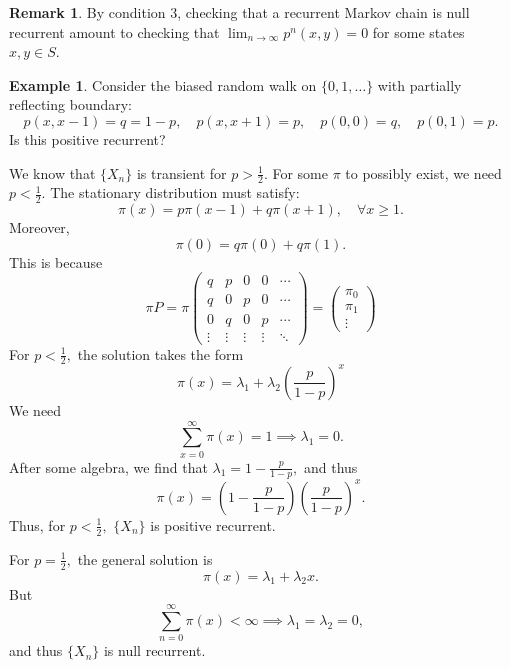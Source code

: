 \documentclass[10pt, oneside]{article}
\theoremstyle{definition}
\newtheorem{exmp}{Example}[section]
\newtheorem{rem}{Remark}
\begin{document}
\begin{rem}
    By condition 3, checking that a recurrent Markov chain is null recurrent amount to checking that $\lim_{n\to \infty}p^n(x,y) = 0$ for some states $x,y \in S.$
\end{rem}
\begin{exmp}
    Consider the biased random walk on $\{0,1, \dots\}$ with partially reflecting boundary: 
    \[p(x,x-1) = q= 1-p, \quad p(x,x+1) = p, \quad p(0,0) = q, \quad p(0,1) =p.\]
    Is this positive recurrent?

    We know that $\{X_n\}$ is transient for $p > \frac{1}{2}.$ For some $\pi$ to possibly exist, we need $p < \frac{1}{2}.$ The stationary distribution must satisfy:
    \[\pi(x) = p\pi(x-1) + q\pi(x+1), \quad \forall x\geq 1.\] Moreover, 
    \[\pi(0) = q\pi(0) + q\pi(1).\] This is because 
    \[\pi P = \pi \begin{pmatrix}
        q & p & 0 & 0 & \cdots\\
        q & 0 & p & 0 & \cdots \\
        0 & q & 0 & p& \cdots\\
        \vdots&\vdots& \vdots & \vdots &\ddots
    \end{pmatrix} = \begin{pmatrix}
        \pi_0\\ \pi_1 \\
        \vdots
    \end{pmatrix}\] For $p < \frac{1}{2},$ the solution takes the form 
    \[\pi(x) = \lambda_1 + \lambda_2 (\frac{p}{1-p})^x\] We need 
    \[\sum_{x = 0}^\infty \pi(x) = 1 \implies \lambda_1 = 0.\] After some algebra, we find that $\lambda_1 = 1- \frac{p}{1-p},$ and thus 
    \[\pi(x) = (1- \frac{p}{1-p})(\frac{p}{1-p})^x.\] Thus, for $p< \frac{1}{2},$ $\{X_n\}$ is positive recurrent. 
    
    For $p = \frac{1}{2},$ the general solution is 
    \[\pi(x) = \lambda_1 + \lambda_2 x.\] But
    \[\sum_{n=0}^\infty \pi(x) < \infty \implies \lambda_1 = \lambda_2 = 0,\] and thus $\{X_n\}$ is null recurrent. 
\end{exmp}

\newpage
\end{document}
